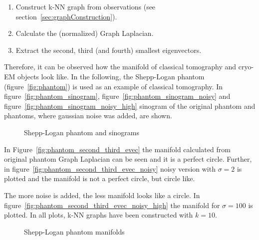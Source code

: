 \begin{enumerate}
    \item Construct k-NN graph from observations (see section~\ref{sec:graphConstruction}).
    \item Calculate the (normalized) Graph Laplacian.
    \item Extract the second, third (and fourth) smallest eigenvectors.
\end{enumerate}

Therefore, it can be observed how the manifold of classical tomography and cryo-EM objects look like.
In the following, the Shepp-Logan phantom (figure~\ref{fig:phantom}) is used as an example of classical tomography.
In figure~\ref{fig:phantom_sinogram}, figure~\ref{fig:phantom_sinogram_noisy} and figure~\ref{fig:phantom_sinogram_noisy_high} 
sinogram of the original phantom and phantoms, where gaussian noise was added, are shown.

\begin{figure}[H]
    \centering
    \caption{Shepp-Logan phantom and sinograms}
\end{figure}

In Figure~\ref{fig:phantom_second_third_evec} the manifold calculated from original phantom Graph Laplacian
can be seen and it is a perfect circle. 
Further, in figure~\ref{fig:phantom_second_third_evec_noisy}
noisy version with $\sigma=2$ is plotted and the manifold is not a perfect circle, but circle like.

The more noise is added, the less manifold looks like a circle. In figure~\ref{fig:phantom_second_third_evec_noisy_high}
the manifold for $\sigma=100$ is plotted. In all plots, k-NN graphs have been constructed with $k=10$. 

\begin{figure}[H]
    \centering
    \caption{Shepp-Logan phantom manifolds}
\end{figure}


